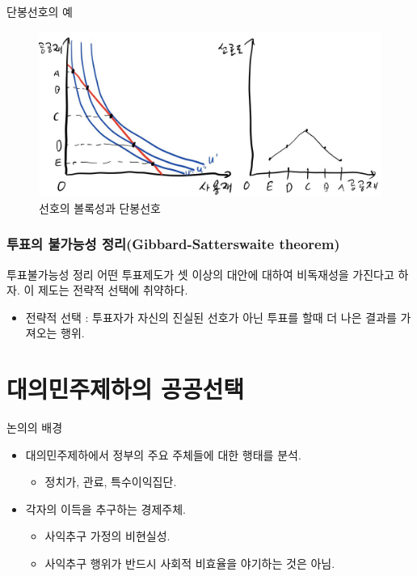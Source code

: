 \documentclass[aspectratio=169,xcolor=dvipsnames,handout]{beamer}
\begin{document}
\begin{frame}{단봉선호의 예 }
    \begin{figure}
        \centering
        \includegraphics[width=.7\textwidth]{pic/singlepeak.jpg}
        \caption{선호의 볼록성과 단봉선호}
    \end{figure}
\end{frame}

\begin{frame}
\frametitle{투표의 불가능성 정리(Gibbard-Satterswaite theorem)}
    \begin{block}{투표불가능성 정리} 
        어떤 투표제도가 셋 이상의 대안에 대하여 비독재성을 가진다고 하자. 이 제도는 전략적 선택에 취약하다.
    \end{block}
    \begin{itemize}
        \item 전략적 선택 : 투표자가 자신의 진실된 선호가 아닌 투표를 할때 더 나은 결과를 가져오는 행위.
    \end{itemize}
\end{frame}

\section{대의민주제하의 공공선택}

\begin{frame}{논의의 배경}
    \begin{itemize}
        \item 대의민주제하에서 정부의 주요 주체들에 대한 행태를 분석.
        \begin{itemize}
            \item 정치가, 관료, 특수이익집단.
        \end{itemize}
        \item 각자의 이득을 추구하는 경제주체.
        \begin{itemize}
            \item 사익추구 가정의 비현실성.
            \item 사익추구 행위가 반드시 사회적 비효율을 야기하는 것은 아님.
        \end{itemize}
    \end{itemize}
\end{frame}
\end{document}
